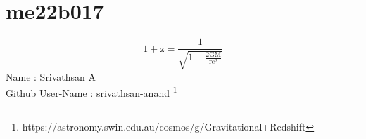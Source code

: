 \section{me22b017}
\begin{equation}
        1 + \text{z} = \frac{1}{\sqrt{1 - \frac{\text{2GM}}{\text{rc} ^{2}}}}
\end{equation}
Name : Srivathsan A \\
Github User-Name : srivathsan-anand
\footnote{https://astronomy.swin.edu.au/cosmos/g/Gravitational+Redshift}
